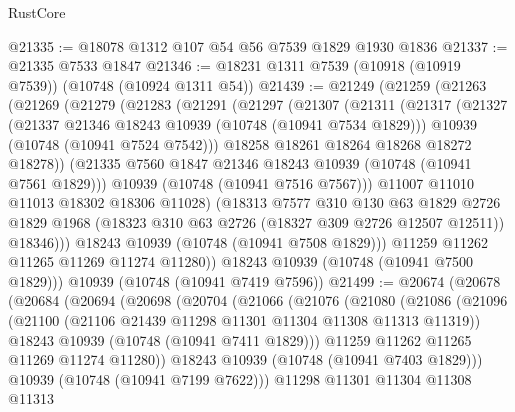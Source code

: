 \begin{lexlean}{RustCore}
\begin{coremodule}
@21335 := @18078 @1312 @107 @54 @56 @7539 @1829 @1930 @1836
@21337 := @21335 @7533 @1847
@21346 := @18231 @1311 @7539 (@10918 (@10919 @7539)) (@10748 (@10924 @1311 @54))
@21439 := @21249
    (@21259
      (@21263
        (@21269
          (@21279
            (@21283
              (@21291
                (@21297
                  (@21307
                    (@21311
                      (@21317
                        (@21327
                          (@21337 @21346 @18243 @10939 (@10748 (@10941 @7534 @1829)))
                          @10939
                          (@10748 (@10941 @7524 @7542)))
                        @18258
                        @18261
                        @18264
                        @18268
                        @18272
                        @18278))
                    (@21335 @7560 @1847 @21346 @18243 @10939 (@10748 (@10941 @7561 @1829)))
                    @10939
                    (@10748 (@10941 @7516 @7567)))
                  @11007
                  @11010
                  @11013
                  @18302
                  @18306
                  @11028)
                (@18313
                  @7577
                  @310
                  @130
                  @63
                  @1829
                  @2726
                  @1829
                  @1968
                  (@18323 @310 @63 @2726 (@18327 @309 @2726 @12507 @12511))
                  @18346)))
            @18243
            @10939
            (@10748 (@10941 @7508 @1829)))
          @11259
          @11262
          @11265
          @11269
          @11274
          @11280))
      @18243
      @10939
      (@10748 (@10941 @7500 @1829)))
    @10939
    (@10748 (@10941 @7419 @7596))
@21499 := @20674
    (@20678
      (@20684
        (@20694
          (@20698
            (@20704
              (@21066
                (@21076
                  (@21080
                    (@21086
                      (@21096
                        (@21100 (@21106 @21439 @11298 @11301 @11304 @11308 @11313 @11319))
                        @18243
                        @10939
                        (@10748 (@10941 @7411 @1829)))
                      @11259
                      @11262
                      @11265
                      @11269
                      @11274
                      @11280))
                  @18243
                  @10939
                  (@10748 (@10941 @7403 @1829)))
                @10939
                (@10748 (@10941 @7199 @7622)))
              @11298
              @11301
              @11304
              @11308
              @11313

\end{coremodule}
\end{lexlean}
